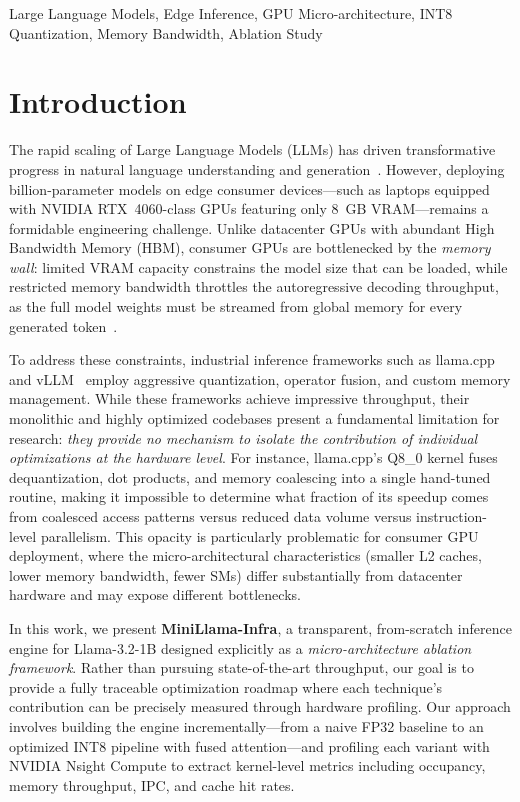 \documentclass[conference]{IEEEtran}
\begin{document}
\begin{IEEEkeywords}
Large Language Models, Edge Inference, GPU Micro-architecture, INT8 Quantization, Memory Bandwidth, Ablation Study
\end{IEEEkeywords}

\section{Introduction}

The rapid scaling of Large Language Models (LLMs) has driven transformative progress in natural language understanding and generation~\cite{touvron2023llama}. However, deploying billion-parameter models on edge consumer devices---such as laptops equipped with NVIDIA RTX~4060-class GPUs featuring only 8~GB VRAM---remains a formidable engineering challenge. Unlike datacenter GPUs with abundant High Bandwidth Memory (HBM), consumer GPUs are bottlenecked by the \emph{memory wall}: limited VRAM capacity constrains the model size that can be loaded, while restricted memory bandwidth throttles the autoregressive decoding throughput, as the full model weights must be streamed from global memory for every generated token~\cite{dao2022flashattention}.

To address these constraints, industrial inference frameworks such as llama.cpp~\cite{llamacpp} and vLLM~\cite{kwon2023vllm} employ aggressive quantization, operator fusion, and custom memory management. While these frameworks achieve impressive throughput, their monolithic and highly optimized codebases present a fundamental limitation for research: \emph{they provide no mechanism to isolate the contribution of individual optimizations at the hardware level}. For instance, llama.cpp's Q8\_0 kernel fuses dequantization, dot products, and memory coalescing into a single hand-tuned routine, making it impossible to determine what fraction of its speedup comes from coalesced access patterns versus reduced data volume versus instruction-level parallelism. This opacity is particularly problematic for consumer GPU deployment, where the micro-architectural characteristics (smaller L2 caches, lower memory bandwidth, fewer SMs) differ substantially from datacenter hardware and may expose different bottlenecks.

In this work, we present \textbf{MiniLlama-Infra}, a transparent, from-scratch inference engine for Llama-3.2-1B designed explicitly as a \emph{micro-architecture ablation framework}. Rather than pursuing state-of-the-art throughput, our goal is to provide a fully traceable optimization roadmap where each technique's contribution can be precisely measured through hardware profiling. Our approach involves building the engine incrementally---from a naive FP32 baseline to an optimized INT8 pipeline with fused attention---and profiling each variant with NVIDIA Nsight Compute to extract kernel-level metrics including occupancy, memory throughput, IPC, and cache hit rates.
\end{document}
